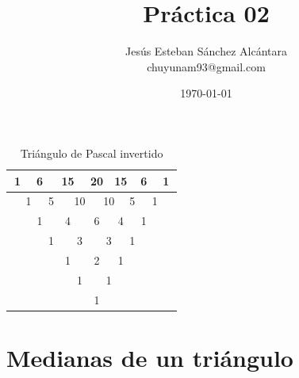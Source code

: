 \documentclass[letterpaper,12pt]{article}
\title{Práctica 02}
\author{Jesús Esteban Sánchez Alcántara\\chuyunam93@gmail.com}
\date{\today}
\begin{document}
\maketitle


\begin{table}[h!]
\centering
\resizebox{0.8\textwidth}{!} {
\begin{tabular}{cccccccccccccc}\hline
\multicolumn{2}{|c|}{1} &\multicolumn{2}{c|}{6}& \multicolumn{2}{c|}{15} & \multicolumn{2}{c|}{20} &   \multicolumn{2}{c|}{15} & \multicolumn{2}{c|}{6} & \multicolumn{2}{c|}{1} \\ \hline 
 & \multicolumn{2}{|c|}{1} &\multicolumn{2}{c|}{5}& \multicolumn{2}{c|}{10} & \multicolumn{2}{c|}{10} &   \multicolumn{2}{c|}{5} & \multicolumn{2}{c|}{1} & \\  
 \cline{2-13}
& & \multicolumn{2}{|c|}{1} &\multicolumn{2}{c|}{4}& \multicolumn{2}{c|}{6} & \multicolumn{2}{c|}{4} &   \multicolumn{2}{c|}{1} & & \\ 
\cline{3-12}
& & & \multicolumn{2}{|c|}{1} &\multicolumn{2}{c|}{3}& \multicolumn{2}{c|}{3} & \multicolumn{2}{c|}{1} & & &\\ 
\cline{4-11}
& & & & \multicolumn{2}{|c|}{1} &\multicolumn{2}{c|}{2}& \multicolumn{2}{c|}{1} & & & &\\ 
\cline{5-10}
& & & & & \multicolumn{2}{|c|}{1} & \multicolumn{2}{c|}{1} & & & & &\\ 
\cline{6-9}
& & & & & & \multicolumn{2}{|c|}{1} & & & & & & \\ 
\cline{7-8}
\end{tabular}
}
\caption{Triángulo de Pascal invertido}
\end{table}

\newpage

\section{Medianas de un triángulo}
\end{document}
